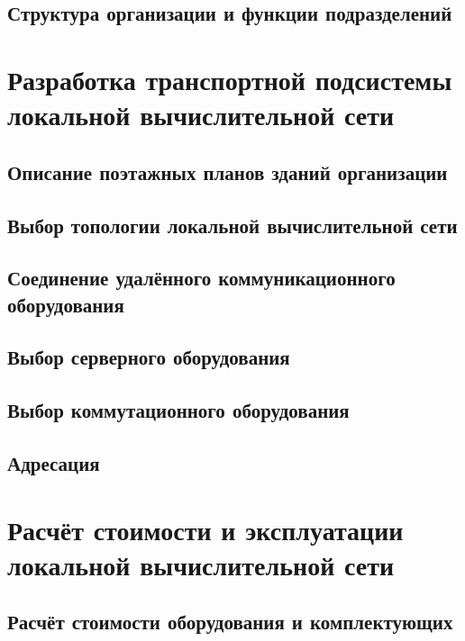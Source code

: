 \documentclass[a4paper,14pt,russian]{article}
\begin{document}
\subsection{Структура организации и функции подразделений}


\section{Разработка транспортной подсистемы локальной вычислительной сети}

\subsection{Описание поэтажных планов зданий организации}


\subsection{Выбор топологии локальной вычислительной сети}


\subsection{Соединение удалённого коммуникационного оборудования}


\subsection{Выбор серверного оборудования}


\subsection{Выбор коммутационного оборудования}


\subsection{Адресация}


\section{Расчёт стоимости и эксплуатации локальной вычислительной сети}

\subsection{Расчёт стоимости оборудования и комплектующих}

\end{document}
